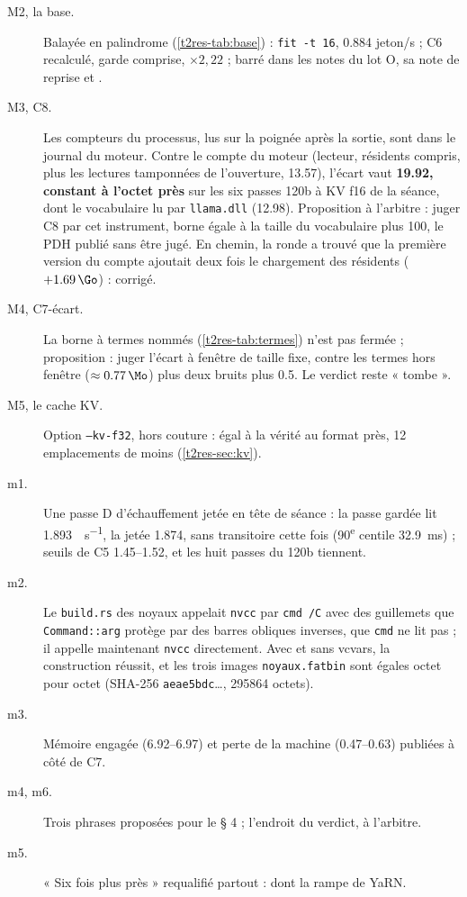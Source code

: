 \begin{description}
\item[M2, la base.] Balayée en palindrome (\cref{t2res-tab:base}) : \texttt{fit -t 16}, \num{0.884} jeton/s ; C6 recalculé, garde comprise, $\times 2{,}22$ ;  barré dans les notes du lot O, sa note de reprise et .
\item[M3, C8.] Les compteurs du processus, lus sur la poignée après la sortie, sont dans le journal du moteur. Contre le compte du moteur (lecteur, résidents compris, plus les lectures tamponnées de l'ouverture, \SI{13.57}{\Mo}), l'écart vaut \textbf{\SI{19.92}{\Mo}, constant à l'octet près} sur les six passes 120b à KV f16 de la séance, dont le vocabulaire lu par \texttt{llama.dll} (\SI{12.98}{\Mo}). Proposition à l'arbitre : juger C8 par cet instrument, borne égale à la taille du vocabulaire plus \SI{100}{\Mo}, le PDH publié sans être jugé. En chemin, la ronde a trouvé que la première version du compte ajoutait deux fois le chargement des résidents ($+\SI{1.69}{\Go}$) : corrigé.
\item[M4, C7-écart.] La borne à termes nommés (\cref{t2res-tab:termes}) n'est pas fermée ; proposition : juger l'écart à fenêtre de taille fixe, contre les termes hors fenêtre ($\approx \SI{0.77}{\Mo}$) plus deux bruits plus \SI{0.5}{\Mo}. Le verdict reste « tombe ».
\item[M5, le cache KV.] Option \texttt{--kv-f32}, hors couture : égal à la vérité au format près, 12 emplacements de moins (\cref{t2res-sec:kv}).
\item[m1.] Une passe D d'échauffement jetée en tête de séance : la passe gardée lit \SI{1.893}{\Go\per\second}, la jetée \num{1.874}, sans transitoire cette fois (90\textsuperscript{e} centile \SI{32.9}{\milli\second}) ; seuils de C5 \numrange{1.45}{1.52}, et les huit passes du 120b tiennent.
\item[m2.] Le \texttt{build.rs} des noyaux appelait \texttt{nvcc} par \texttt{cmd /C} avec des guillemets que \texttt{Command::arg} protège par des barres obliques inverses, que \texttt{cmd} ne lit pas ; il appelle maintenant \texttt{nvcc} directement. Avec et sans vcvars, la construction réussit, et les trois images \texttt{noyaux.fatbin} sont égales octet pour octet (SHA-256 \texttt{aeae5bdc}…, \num{295864} octets).
\item[m3.] Mémoire engagée (\SIrange{6.92}{6.97}{\Go}) et perte de la machine (\SIrange{0.47}{0.63}{\Go}) publiées à côté de C7.
\item[m4, m6.] Trois phrases proposées pour le § 4 ; l'endroit du verdict, à l'arbitre.
\item[m5.] « Six fois plus près » requalifié partout : dont la rampe de YaRN.
\end{description}

